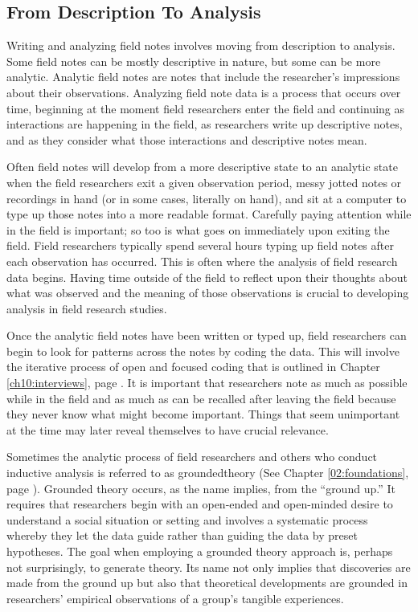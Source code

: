\subsection{From Description To Analysis}

Writing and analyzing field notes involves moving from description to analysis. Some field notes can be mostly descriptive in nature, but some can be more analytic. Analytic field notes are notes that include the researcher's impressions about their observations. Analyzing field note data is a process that occurs over time, beginning at the moment field researchers enter the field and continuing as interactions are happening in the field, as researchers write up descriptive notes, and as they consider what those interactions and descriptive notes mean.

Often field notes will develop from a more descriptive state to an analytic state when the field researchers exit a given observation period, messy jotted notes or recordings in hand (or in some cases, literally on hand), and sit at a computer to type up those notes into a more readable format. Carefully paying attention while in the field is important; so too is what goes on immediately upon exiting the field. Field researchers typically spend several hours typing up field notes after each observation has occurred. This is often where the analysis of field research data begins. Having time outside of the field to reflect upon their thoughts about what was observed and the meaning of those observations is crucial to developing analysis in field research studies.

Once the analytic field notes have been written or typed up, field researchers can begin to look for patterns across the notes by coding the data. This will involve the iterative process of open and focused coding that is outlined in Chapter \ref{ch10:interviews}, page \pageref{ch10:interviews}. It is important that researchers note as much as possible while in the field and as much as can be recalled after leaving the field because they never know what might become important. Things that seem unimportant at the time may later reveal themselves to have crucial relevance.

Sometimes the analytic process of field researchers and others who conduct inductive analysis is referred to as \gls{groundedtheory} (See Chapter \ref{02:foundations}, page \pageref{02:foundations}). Grounded theory occurs, as the name implies, from the ``ground up.'' It requires that researchers begin with an open-ended and open-minded desire to understand a social situation or setting and involves a systematic process whereby they let the data guide rather than guiding the data by preset hypotheses. The goal when employing a grounded theory approach is, perhaps not surprisingly, to generate theory. Its name not only implies that discoveries are made from the ground up but also that theoretical developments are grounded in researchers' empirical observations of a group's tangible experiences.

